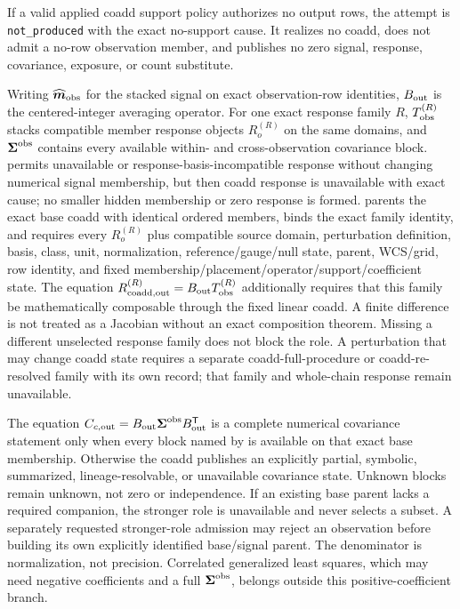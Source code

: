 \documentclass[10pt]{article}
\begin{document}
If a valid applied coadd support policy authorizes no output rows, the attempt
is \texttt{not\_produced} with the exact no-support cause. It realizes no coadd,
does not admit a no-row observation member, and publishes no zero signal,
response, covariance, exposure, or count substitute.

Writing \(\widehat{\boldsymbol m}_{\rm obs}\) for the stacked signal on exact
observation-row identities, \(B_{\rm out}\) is the centered-integer averaging
operator. For one exact response family \(R\), \(T_{\rm obs}^{(R)}\) stacks
compatible member response objects \(R_o^{(R)}\) on the same domains, and
\(\boldsymbol\Sigma^{\rm obs}\) contains every available
within- and cross-observation covariance block. \SCIMapBaseCoaddRole{} permits
unavailable or response-basis-incompatible response without changing numerical
signal membership, but then coadd response is unavailable with exact cause;
no smaller hidden membership or zero response is formed.
\SCIMapResponseCoaddRole{} parents the exact base coadd with identical ordered
members, binds the exact family identity, and requires every \(R_o^{(R)}\) plus
compatible source domain, perturbation definition, basis, class, unit,
normalization, reference/gauge/null state, parent, WCS/grid, row identity, and
fixed membership/placement/operator/support/coefficient state. The equation
\(R_{{\rm coadd,out}}^{(R)}=B_{\rm out}T_{\rm obs}^{(R)}\) additionally requires
that this family be mathematically composable through the fixed linear coadd.
A finite difference is not treated as a Jacobian without an exact composition
theorem. Missing a different unselected response family does not block the
role. A perturbation that may change coadd state requires a separate
coadd-full-procedure or coadd-re-resolved family with its own
\SCIMapComparisonSpaceRecordId{} record; that family and whole-chain response
remain unavailable.

The equation
\(C_{c,{\rm out}}=B_{\rm out}\boldsymbol\Sigma^{\rm obs}B_{\rm out}^{\mathsf T}\)
is a complete numerical covariance statement only when every block named by
\SCIMapCovarianceCoaddRole{} is available on that exact base membership. Otherwise the coadd
publishes an explicitly partial, symbolic, summarized, lineage-resolvable, or
unavailable covariance state. Unknown blocks remain unknown, not zero or
independence. If an existing base parent lacks a required companion, the
stronger role is unavailable and never selects a subset. A separately
requested stronger-role admission may reject an observation before building
its own explicitly identified base/signal parent. The denominator is normalization,
not precision. Correlated generalized least squares, which may
need negative coefficients and a full \(\boldsymbol\Sigma^{\rm obs}\), belongs
outside this positive-coefficient branch.
\end{document}
